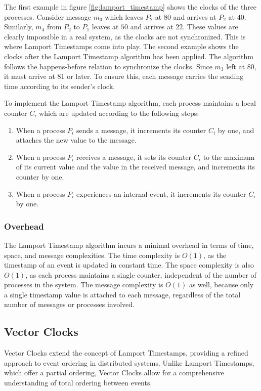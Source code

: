 \documentclass{article}
\begin{document}
    The first example in figure \ref{fig:lamport_timestamp} shows the clocks of the three processes. Consider message $m_3$ which leaves $P_2$ at $80$ and arrives at $P_2$ at $40$. Similarly, $m_4$ from $P_2$ to $P_1$ leaves at $50$ and arrives at $22$. These values are clearly impossible in a real system, as the clocks are not synchronized. This is where Lamport Timestamps come into play.
    The second example shows the clocks after the Lamport Timestamp algorithm has been applied. The algorithm follows the happens-before relation to synchronize the clocks. Since $m_3$ left at $80$, it must arrive at $81$ or later. To ensure this, each message carries the sending time according to its sender's clock.

    To implement the Lamport Timestamp algorithm, each process maintains a local counter $C_i$ which are updated according to the following steps\cite{Raynal-Singhal:1996}:
    \begin{enumerate}
      \item When a process $P_i$ sends a message, it increments its counter $C_i$ by one, and attaches the new value to the message.
      \item When a process $P_i$ receives a message, it sets its counter $C_i$ to the maximum of its current value and the value in the received message, and increments its counter by one.
      \item When a process $P_i$ experiences an internal event, it increments its counter $C_i$ by one.
    \end{enumerate}

  \subsubsection{Overhead}
  The Lamport Timestamp algorithm incurs a minimal overhead in terms of time, space, and message complexities. The time complexity is $O(1)$, as the timestamp of an event is updated in constant time. The space complexity is also $O(1)$, as each process maintains a single counter, independent of the number of processes in the system. The message complexity is $O(1)$ as well, because only a single timestamp value is attached to each message, regardless of the total number of messages or processes involved.

  \subsection{Vector Clocks}
    Vector Clocks extend the concept of Lamport Timestamps, providing a refined approach to event ordering in distributed systems. Unlike Lamport Timestamps, which offer a partial ordering, Vector Clocks allow for a comprehensive understanding of total ordering between events.
\end{document}
